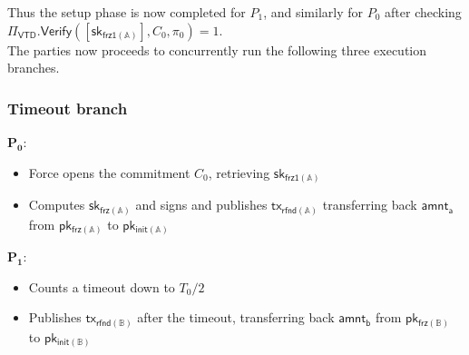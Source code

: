 \documentclass{article}      	%
\begin{document}
Thus the setup phase is now completed for $P_1$, and similarly for $P_0$ after checking $\Pi_{\mathsf{VTD}}.\mathsf{Verify}([\mathsf{sk_{frz1(\mathbb{A})}}], C_0, \pi_0) = 1$. \\
The parties now proceeds to concurrently run the following three execution branches. \\

\subsubsection*{Timeout branch}
\: $\mathbf{P_0:}$
\begin{itemize}
    \item Force opens the commitment $C_0$, retrieving  $\mathsf{sk_{frz1(\mathbb{A})}}$
    \item Computes $\mathsf{sk_{frz(\mathbb{A})}}$ and signs and publishes $\mathsf{tx_{rfnd(\mathbb{A})}}$ transferring back $\mathsf{amnt_a}$ from $\mathsf{pk_{frz(\mathbb{A})}}$ to $\mathsf{pk_{init(\mathbb{A})}}$ \\
\end{itemize}
\: $\mathbf{P_1:}$
\begin{itemize}
    \item Counts a timeout down to $T_0/2$
    \item Publishes $\mathsf{tx_{rfnd(\mathbb{B})}}$ after the timeout, transferring back $\mathsf{amnt_b}$ from $\mathsf{pk_{frz(\mathbb{B})}}$ to $\mathsf{pk_{init(\mathbb{B})}}$ \\
\end{itemize}
\end{document}
